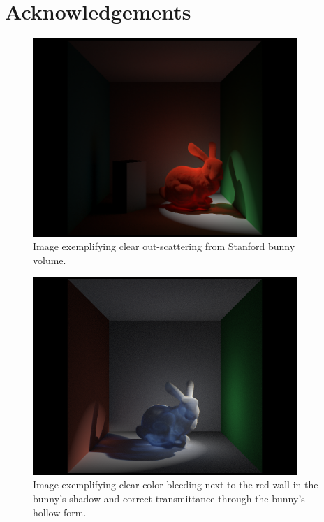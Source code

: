 \documentclass[runningheads]{llncs}
\begin{document}





\section*{Acknowledgements}



\begin{figure}[h!]
    \centering
    \includegraphics[width=100mm]{img/ketchup_good.png}
    \caption{Image exemplifying clear out-scattering from Stanford bunny volume.}
\end{figure}

\begin{figure}[h!]
    \centering
    \includegraphics[width=100mm]{img/bunny_spot/spot_right.png}
    \caption{Image exemplifying clear color bleeding next to the red wall in the bunny's shadow and correct transmittance through the bunny's hollow form.}
\end{figure}
\end{document}
